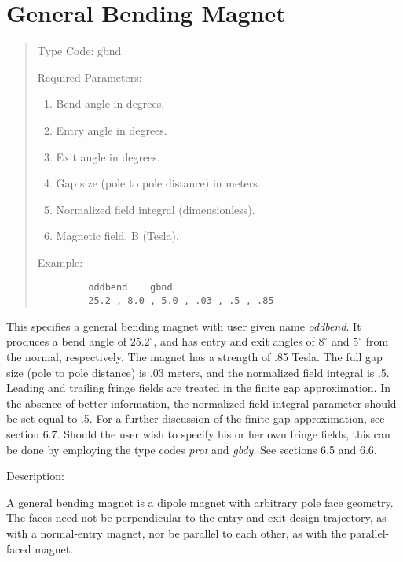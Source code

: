 \section{General Bending Magnet}
\begin{quotation}
\noindent Type Code:  gbnd
\vspace{5mm}

\noindent Required Parameters:
\begin{enumerate}
   \item  Bend angle in degrees.
   \item  Entry angle in degrees.
   \item  Exit angle in degrees.
   \item  Gap size (pole to pole distance) in meters.
   \item  Normalized field integral (dimensionless).
   \item  Magnetic field, B (Tesla).
\end{enumerate}

\vspace{5mm}
\noindent Example:
\begin{verbatim}
         oddbend    gbnd
         25.2 , 8.0 , 5.0 , .03 , .5 , .85
\end{verbatim}
\end{quotation}
This specifies a general bending magnet with user given name {\em oddbend}.   It
produces a bend angle of $25.2^\circ$, and has entry and exit angles of $8^\circ$
and $5^\circ$ from the normal, respectively.  The magnet has a strength of
.85 Tesla.  The full gap size (pole to pole distance) is .03 meters, and the normalized field integral is .5.  Leading and trailing fringe fields are treated in the finite gap approximation.  In the absence of better information, the normalized field integral parameter should be set equal to .5.  For a further discussion of the finite gap approximation, see section 6.7.  Should the user wish to specify his or her own fringe fields, this can be done by employing the type codes {\em prot} and {\em gbdy}.  See sections 6.5 and 6.6.

\vspace{5mm}
     Description:
\vspace{2mm}

         A general bending magnet is a dipole magnet with arbitrary pole
face geometry.  The faces need not be perpendicular to the entry and exit
design trajectory, as with a normal-entry magnet, nor be parallel to each
other, as with the parallel-faced magnet.

